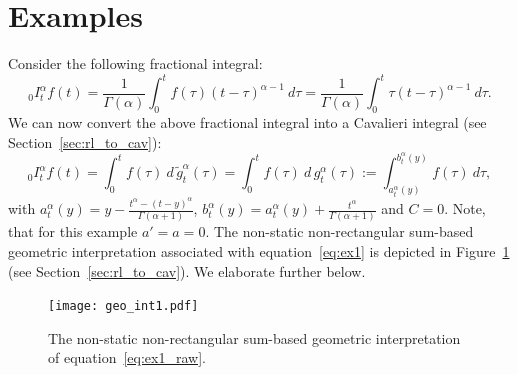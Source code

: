 \documentclass[twoside,reqno,11pt]{fcaa-var} %
\begin{document}
\section{Examples}
\noindent
Consider the following fractional integral:
\begin{equation}
\label{eq:ex1_raw}
_0I_t^{\alpha} f(t) = \frac{1}{\Gamma(\alpha)}\int_0^t f(\tau) (t-\tau)^{\alpha-1}~d\tau = \frac{1}{\Gamma(\alpha)}\int_0^t \tau(t-\tau)^{\alpha-1}~d\tau. 
\end{equation}
We can now convert the above fractional integral into a Cavalieri integral (see Section~\ref{sec:rl_to_cav}):
\begin{equation}
\label{eq:ex1}
_0I_t^{\alpha} f(t) = \int_0^t f(\tau)~d\,\widetilde{g}_t^{\alpha}(\tau)=\int_0^t f(\tau)~d\,g_t^{\alpha}(\tau):=\int_{a_t^{\alpha}(y)}^{b_t^{\alpha}(y)} f(\tau)~d\tau,
\end{equation}
with $a_t^{\alpha}(y) = y - \frac{t^{\alpha}-(t-y)^{\alpha}}{\Gamma(\alpha+1)}$, $b_t^{\alpha}(y) = a_t^{\alpha}(y) + \frac{t^{\alpha}}{\Gamma(\alpha+1)}$ and $C=0$.
Note, that for this example $a'=a=0$. The non-static non-rectangular sum-based geometric interpretation associated with equation~\eqref{eq:ex1} is depicted in Figure~\ref{fig:geo1} (see Section~\ref{sec:rl_to_cav}). We elaborate further below.\\  

\begin{figure}[htb]
\centering
\texttt{[image: geo\_int1.pdf]}
\caption{The non-static non-rectangular sum-based geometric interpretation of equation~\eqref{eq:ex1_raw}.}
\label{fig:geo1}
\end{figure}

\end{document}
